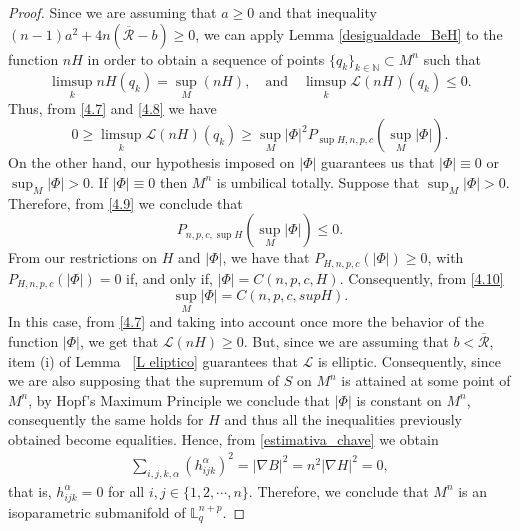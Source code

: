 \documentclass[leqno,11pt]{amsart}
\theoremstyle{plain}
\theoremstyle{definition}
\numberwithin{equation}{section}
\begin{document}
\begin{proof}
Since we are assuming that $a\geq 0$ and that inequality $(n-1)a^2+4n(\overline{\mathcal{R}}-b)\geq 0$,
we can apply Lemma \ref{desigualdade_BeH} to the function $nH$ in order to obtain a sequence of points $\{q_k\}_{k\in \mathbb{N}}\subset M^n$ such that
\begin{equation}\label{4.8}
\limsup_{k}nH(q_k)=\sup_{M}(nH),\quad\mbox{and}\quad \limsup_{k}\mathcal{L}(nH)(q_k)\leq 0.
\end{equation}
Thus, from \eqref{4.7} and \eqref{4.8} we have 
\begin{equation}\label{4.9}
0\geq \limsup_{k}\mathcal{L}(nH)(q_k)\geq \sup_{M}|\Phi|^2P_{\sup H,n,p,c}\left(\sup_{M}|\Phi|\right).
\end{equation}
On the other hand, our hypothesis imposed on $|\Phi|$ guarantees us that $|\Phi|\equiv 0$ or $\sup_{M}|\Phi|>0.$ If $|\Phi|\equiv 0$ then $M^n$ is umbilical totally. Suppose that $\sup_{M}|\Phi|>0.$ Therefore, from \eqref{4.9} we conclude that 
\begin{equation}\label{4.10}
P_{n,p,c,\sup H}\left(\sup_{M}|\Phi|\right)\leq 0.
\end{equation}
From our restrictions on $H$ and $|\Phi|$, we have that $P_{H,n,p,c}(|\Phi|)\geq  0$, with $P_{H,n,p,c}(|\Phi|)=0$ if, and only if, $|\Phi|=C(n,p,c,H).$ Consequently, from \eqref{4.10}
\begin{equation}\label{hipparaparabolicidade}
\sup_{M}|\Phi|=C(n,p,c,supH).
\end{equation}
In this case, from \eqref{4.7} and taking into account once more the behavior of the
function $|\Phi|$, we get that $\mathcal{L}(nH)\geq 0.$ But, since we are assuming that
$b<\overline{\mathcal{R}}$, item (i) of Lemma ~\ref{L eliptico} guarantees that $\mathcal{L}$ is elliptic. Consequently, since we are also supposing that the supremum of $S$ on $M^n$ is attained at some point of $M^n$, by Hopf’s Maximum Principle we conclude that $|\Phi|$ is constant on $M^n$, consequently the same holds for $H$ and thus all the inequalities previously obtained become equalities. Hence, from \eqref{estimativa_chave} we obtain
\begin{eqnarray*}
\sum_{i,j,k,\alpha}(h_{ijk}^{\alpha})^2=|\nabla B|^2=n^2|\nabla H|^2=0,
\end{eqnarray*}
that is, $h_{ijk}^{\alpha}=0$ for all $i,j\in \{1,2,\cdots,n\}.$ 
Therefore, we conclude that $M^n$ is an
isoparametric submanifold of $\mathbb{L}_{q}^{n+p}.$

\end{proof}
\end{document}
